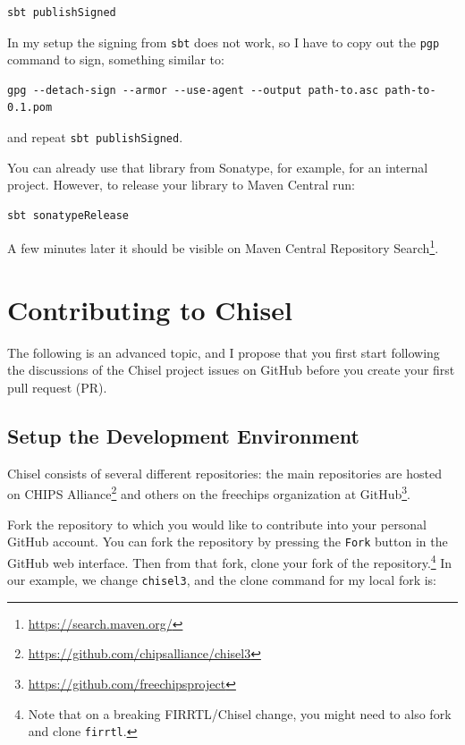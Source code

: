 \documentclass[%
    10pt,
    headinclude, footexclude,
    openright, %
    notitlepage,
    cleardoubleempty,
    headsepline,
    pointlessnumbers,
    bibtotoc, idxtotoc,
    ]{scrbook}
\newcommand{\code}[1]{{\lstinline[basicstyle=\small\ttfamily]{#1}}}
\newcommand{\myref}[2]{\href{#1}{#2}}
\renewcommand{\myref}[2]{{#2}{\footnote{\url{#1}}}}
\begin{document}
\begin{verbatim}
sbt publishSigned
\end{verbatim}

In my setup the signing from \code{sbt} does not work, so I have to copy
out the \code{pgp} command to sign, something similar to:

\begin{verbatim}
gpg --detach-sign --armor --use-agent --output path-to.asc path-to-0.1.pom
\end{verbatim}

\noindent and repeat \code{sbt publishSigned}.

You can already use that library from Sonatype, for example, for an internal project.
However, to release your library to Maven Central run:

\begin{verbatim}
sbt sonatypeRelease
\end{verbatim}

A few minutes later it should be visible on \myref{https://search.maven.org/}{Maven Central
Repository Search}.

\section{Contributing to Chisel}

The following is an advanced topic, and I propose that you first start following the discussions
of the Chisel project issues on GitHub before you create your first pull request (PR).

\subsection{Setup the Development Environment}

Chisel consists of several different repositories: the main repositories are hosted on
\myref{https://github.com/chipsalliance/chisel3}{CHIPS Alliance} and others on
the \myref{https://github.com/freechipsproject}{freechips organization at GitHub}.

Fork the repository to which you would like to contribute into your personal GitHub account.
You can fork the repository by pressing the \code{Fork} button in the GitHub web interface.
Then from that fork, clone your fork of the repository.\footnote{Note that on a breaking
FIRRTL/Chisel change, you might need to also fork and clone \code{firrtl}.}
In our example, we change \code{chisel3}, and the clone command for my local fork is:
\end{document}
